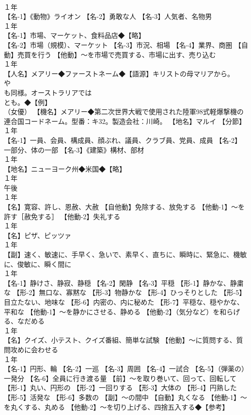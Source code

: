 \documentclass[8pt]{extreport}
\begin{document}
\begin{CJK}{UTF8}{min}
\\	１年	
\\	【名-1】《動物》ライオン 【名-2】勇敢な人 【名-3】人気者、名物男
\\	１年	
\\	【名-1】市場、マーケット、食料品店◆【略】
\\	【名-2】市場（規模）、マーケット 【名-3】市況、相場 【名-4】業界、商圏 【自動】売買を行う 【他動】～を市場で売買する、市場に出す、売り込む
\\	１年	
\\	【人名】メアリー◆ファーストネーム◆【語源】キリストの母マリアから。
\\	や 
\\	も同様。オーストラリアでは 
\\	とも。◆【例】
\\	（女優） 【機名】メアリー◆第二次世界大戦で使用された陸軍98式軽爆撃機の連合国コードネーム。型番：キ32。製造会社：川崎。 【地名】マルイ 【分節】
\\	１年	
\\	【名-1】一員、会員、構成員、顔ぶれ、議員、クラブ員、党員、成員 【名-2】一部分、体の一部 【名-3】《建築》構材、部材
\\	１年	
\\	【地名】ニューヨーク州◆米国◆【略】
\\	１年	
\\	午後
\\	１年	
\\	【名】寛容、許し、恩赦、大赦 【自他動】免除する、放免する 【他動-1】～を許す［赦免する］ 【他動-2】失礼する
\\	１年	
\\	【名】ピザ、ピッツァ
\\	１年	
\\	【副】速く、敏速に、手早く、急いで、素早く、直ちに、瞬時に、緊急に、機敏に、俊敏に、瞬く間に
\\	１年	
\\	【名-1】静けさ、静寂、静穏 【名-2】閑静 【名-3】平穏 【形-1】静かな、静粛な 【形-2】無口な、寡黙な 【形-3】物静かな 【形-4】ひっそりとした 【形-5】目立たない、地味な 【形-6】内密の、内に秘めた 【形-7】平穏な、穏やかな、平和な 【他動-1】～を静かにさせる、静める 【他動-2】（気分など）を和らげる、なだめる
\\	１年	
\\	【名】クイズ、小テスト、クイズ番組、簡単な試験 【他動】～に質問する、質問攻めに会わせる
\\	１年	
\\	【名-1】円形、輪 【名-2】一巡 【名-3】周囲 【名-4】一試合 【名-5】（弾薬の）一発分 【名-6】全員に行き渡る量 【前】～を取り巻いて、回って、回転して 【形-1】丸い、円形の 【形-2】一回りする 【形-3】大体の 【形-4】円熟した 【形-5】活発な 【形-6】多数の 【副】～の間中 【自動】丸くなる 【他動-1】～を丸くする、丸める 【他動-2】～を切り上げる、四捨五入する◆【参考】

\end{CJK}
\end{document}
